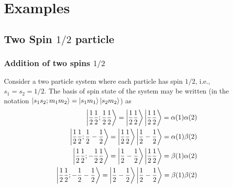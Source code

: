 \section{Examples}
\subsection{Two Spin \texorpdfstring{$1/2$}{1/2} particle}
\subsubsection{Addition of two spins \texorpdfstring{$1/2$}{1/2}}
Consider a two particle system where each particle has spin $1/2$, i.e., $s_1=s_2 = 1/2$. The basis of spin state of the system may be written (in the notation $\ket{s_1 s_2; m_1 m_2} = \ket{s_1 m_1}\ket{s_2 m_2}$) as
\begin{align*}
\ket{\frac{1}{2} \frac{1}{2}; \frac{1}{2} \frac{1}{2}} = \ket{\frac{1}{2} \frac{1}{2}} \ket{\frac{1}{2} \frac{1}{2}} = \alpha(1)\alpha(2) \\
\ket{\frac{1}{2} \frac{1}{2}; \frac{1}{2} -\frac{1}{2}} = \ket{\frac{1}{2} \frac{1}{2}} \ket{\frac{1}{2} -\frac{1}{2}} = \alpha(1)\beta(2) \\
\ket{\frac{1}{2} \frac{1}{2}; -\frac{1}{2} \frac{1}{2}} = \ket{\frac{1}{2} -\frac{1}{2}} \ket{\frac{1}{2} \frac{1}{2}} = \beta(1)\alpha(2) \\
\ket{\frac{1}{2} \frac{1}{2}; -\frac{1}{2} -\frac{1}{2}} = \ket{\frac{1}{2} -\frac{1}{2}} \ket{\frac{1}{2} -\frac{1}{2}} = \beta(1)\beta(2)
\end{align*}

